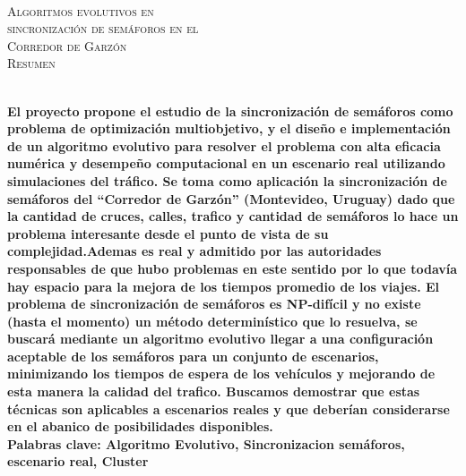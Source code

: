 {
\thispagestyle{empty}
~\\[0.2cm]
\begin{center}
    \textsc{\huge Algoritmos evolutivos en  } \\[0.2cm] 
    \textsc{\huge sincronización de semáforos en el  } \\[0.2cm]         
    \textsc{\huge Corredor de Garzón} \\[1cm]
    \textsc{\Large Resumen}
\end{center}
~\\[0.2cm]
\textbf{\large 
El proyecto propone el estudio de la sincronización de semáforos como problema de optimización multiobjetivo, y el diseño e implementación de un algoritmo evolutivo para resolver el problema con alta eficacia numérica y desempeño computacional en un escenario real utilizando simulaciones del tráfico. \newline \newline
Se toma como aplicación la sincronización de semáforos del “Corredor de Garzón” (Montevideo, Uruguay) dado que la cantidad de cruces, calles, trafico y cantidad de semáforos lo hace un problema interesante desde el punto de vista de su complejidad.Ademas es real y admitido por las autoridades responsables de que hubo problemas en este sentido por lo que todavía hay espacio para la mejora de los tiempos promedio de los viajes.  \newline \newline
El problema de sincronización de semáforos es NP-difícil y no existe (hasta el momento) un método determinístico que lo resuelva, se buscará mediante un algoritmo evolutivo llegar a una configuración aceptable de los semáforos para un conjunto de escenarios, minimizando los tiempos de espera de los vehículos y mejorando de esta manera la calidad del trafico.
Buscamos demostrar que estas técnicas son aplicables a escenarios reales y que deberían considerarse en el abanico de posibilidades disponibles. } 	
	~\\[1.0cm]
    \textbf{\large Palabras clave: Algoritmo Evolutivo, Sincronizacion semáforos, escenario real, Cluster}

}
\cleardoublepage
